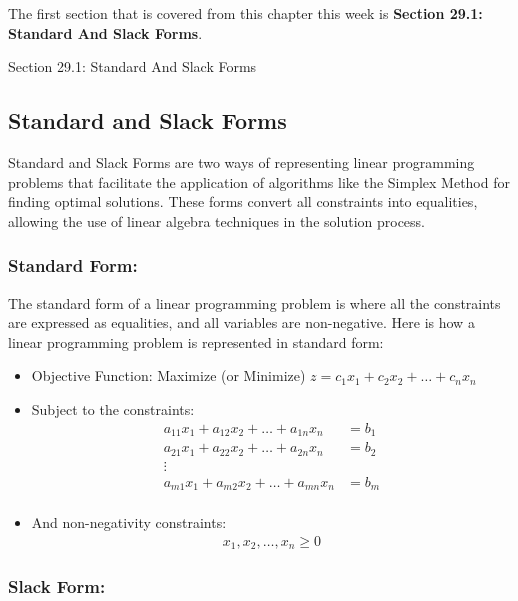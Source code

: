 The first section that is covered from this chapter this week is \textbf{Section 29.1: Standard And Slack Forms}.

\begin{notes}{Section 29.1: Standard And Slack Forms}
    \subsection*{Standard and Slack Forms}

    Standard and Slack Forms are two ways of representing linear programming problems that facilitate the application of algorithms like the Simplex Method for finding optimal solutions. These forms 
    convert all constraints into equalities, allowing the use of linear algebra techniques in the solution process. \vspace*{1em}
    
    \subsubsection*{Standard Form:}
    
    The standard form of a linear programming problem is where all the constraints are expressed as equalities, and all variables are non-negative. Here is how a linear programming problem is represented in standard form:
    
    \begin{itemize}
        \item Objective Function: Maximize (or Minimize) $z = c_1x_1 + c_2x_2 + \ldots + c_nx_n$
        \item Subject to the constraints:
        \begin{align*}
        a_{11}x_1 + a_{12}x_2 + \ldots + a_{1n}x_n &= b_1 \\
        a_{21}x_1 + a_{22}x_2 + \ldots + a_{2n}x_n &= b_2 \\
        \vdots \\
        a_{m1}x_1 + a_{m2}x_2 + \ldots + a_{mn}x_n &= b_m \\
        \end{align*}
        \item And non-negativity constraints:
        \begin{align*}
        x_1, x_2, \ldots, x_n \geq 0
        \end{align*}
    \end{itemize}
    
    \subsubsection*{Slack Form:}
    

\end{notes}
